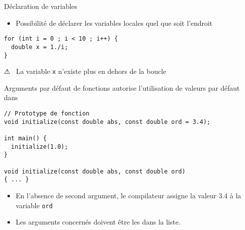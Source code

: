 \documentclass[c]{beamer}
\begin{document}
\begin{frame}[fragile]{Déclaration de variables}

\begin{itemize}
\item Possibilité de déclarer les variables locales quel que soit l'endroit
\end{itemize}
\begin{verbatim}
for (int i = 0 ; i < 10 ; i++) {
  double x = 1./i;
}
\end{verbatim}

\begin{cbox}[][][\centering]
⚠ \ La variable \texttt{x} n'existe plus en dehors de la boucle
\end{cbox}

\end{frame}


\begin{frame}[fragile]{Arguments par défaut de fonctions}
 \Cpp autorise l'utilisation de valeurs par défaut dans 

\begin{verbatim}
// Prototype de fonction
void initialize(const double abs, const double ord = 3.4);

int main() {
  initialize(1.0);
}

void initialize(const double abs, const double ord)
{ ... }
\end{verbatim}

\begin{itemize}
\item En l'absence de second argument, le compilateur assigne la valeur 3.4 à la
variable \texttt{ord}

\item Les arguments concernés doivent  être les  dans la
liste.
\end{itemize}
\end{frame}

\end{document}
